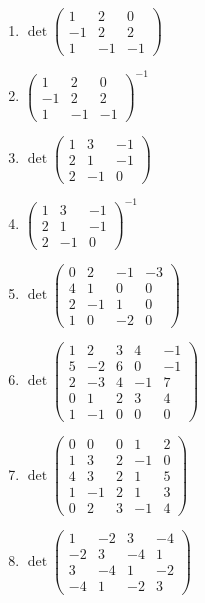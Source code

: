 \documentclass[11pt,a4paper]{article}
\begin{document}
\begin{enumerate}
\item $\displaystyle \det \begin{pmatrix} 1 & 2 & 0 \\ -1 & 2 & 2 \\ 1 & -1 & -1 \end{pmatrix}$
\item $\displaystyle \begin{pmatrix} 1 & 2 & 0 \\ -1 & 2 & 2 \\ 1 & -1 & -1 \end{pmatrix}^{-1}$
\item $\displaystyle \det \begin{pmatrix} 1 & 3 & -1 \\ 2 & 1 & -1 \\ 2 & -1 & 0 \end{pmatrix}$
\item $\displaystyle \begin{pmatrix} 1 & 3 & -1 \\ 2 & 1 & -1 \\ 2 & -1 & 0 \end{pmatrix}^{-1}$
\item $\displaystyle \det \begin{pmatrix} 0 & 2 & -1 & -3 \\ 4 & 1 & 0 & 0 \\ 2 & -1 & 1 & 0 \\ 1 & 0 & -2 & 0 \end{pmatrix}$
\item $\displaystyle \det \begin{pmatrix} 1 & 2 & 3 & 4 & -1 \\ 5 & -2 & 6 & 0 & -1 \\ 2 & -3 & 4 & -1 & 7 \\ 0 & 1 & 2 & 3 & 4 \\ 1 & -1 & 0 & 0 & 0 \end{pmatrix}$
\item $\displaystyle \det \begin{pmatrix} 0 & 0 & 0 & 1 & 2 \\ 1 & 3 & 2 & -1 & 0 \\ 4 & 3 & 2 & 1 & 5 \\ 1 & -1 & 2 & 1 & 3 \\ 0 & 2 & 3 & -1 & 4 \end{pmatrix}$
\item $\displaystyle \det \begin{pmatrix} 1 & -2 & 3 & -4 \\ -2 & 3 & -4 & 1 \\ 3 & -4 & 1 & -2 \\ -4 & 1 & -2 & 3 \end{pmatrix}$

\end{enumerate}
\end{document}
